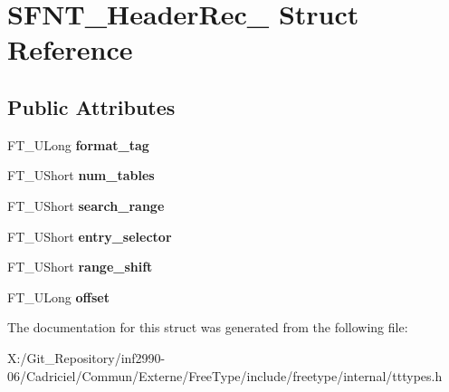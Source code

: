 \hypertarget{struct_s_f_n_t___header_rec__}{\section{S\-F\-N\-T\-\_\-\-Header\-Rec\-\_\- Struct Reference}
\label{struct_s_f_n_t___header_rec__}
}
\subsection*{Public Attributes}
\begin{DoxyCompactItemize}
\item 
\hypertarget{struct_s_f_n_t___header_rec___ad59d649b189ab19fae02341e95e02448}{F\-T\-\_\-\-U\-Long {\bfseries format\-\_\-tag}}\label{struct_s_f_n_t___header_rec___ad59d649b189ab19fae02341e95e02448}

\item 
\hypertarget{struct_s_f_n_t___header_rec___a46d8d8bf8f2d8b6536eb5fa5704852e2}{F\-T\-\_\-\-U\-Short {\bfseries num\-\_\-tables}}\label{struct_s_f_n_t___header_rec___a46d8d8bf8f2d8b6536eb5fa5704852e2}

\item 
\hypertarget{struct_s_f_n_t___header_rec___a39ca0e21eaec6be602547bb2ed898d5d}{F\-T\-\_\-\-U\-Short {\bfseries search\-\_\-range}}\label{struct_s_f_n_t___header_rec___a39ca0e21eaec6be602547bb2ed898d5d}

\item 
\hypertarget{struct_s_f_n_t___header_rec___ada628a85486eb034abd56b872ecdcd78}{F\-T\-\_\-\-U\-Short {\bfseries entry\-\_\-selector}}\label{struct_s_f_n_t___header_rec___ada628a85486eb034abd56b872ecdcd78}

\item 
\hypertarget{struct_s_f_n_t___header_rec___aa2a39db194a8a9a0cc8504143ac4f5c1}{F\-T\-\_\-\-U\-Short {\bfseries range\-\_\-shift}}\label{struct_s_f_n_t___header_rec___aa2a39db194a8a9a0cc8504143ac4f5c1}

\item 
\hypertarget{struct_s_f_n_t___header_rec___a04f99ce2ff335f8702a4edf7132a3e04}{F\-T\-\_\-\-U\-Long {\bfseries offset}}\label{struct_s_f_n_t___header_rec___a04f99ce2ff335f8702a4edf7132a3e04}

\end{DoxyCompactItemize}


The documentation for this struct was generated from the following file\-:\begin{DoxyCompactItemize}
\item 
X\-:/\-Git\-\_\-\-Repository/inf2990-\/06/\-Cadriciel/\-Commun/\-Externe/\-Free\-Type/include/freetype/internal/tttypes.\-h\end{DoxyCompactItemize}
